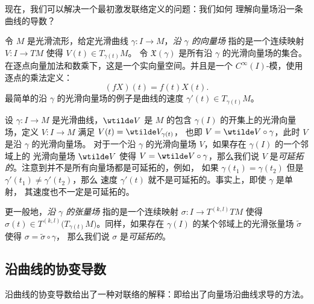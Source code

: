现在，我们可以解决一个最初激发联络定义的问题：我们如何
理解向量场沿一条曲线的导数？

令 $M$ 是光滑流形，给定光滑曲线 $\gamma:I\to M$，\emph{沿 $\gamma$ 的向量场}
指的是一个连续映射 $V:I\to TM$ 使得 $V(t)\in T_{\gamma(t)}M$。
令 $\mathfrak{X}(\gamma)$ 是所有沿 $\gamma$ 的光滑向量场的集合。
在逐点向量加法和数乘下，这是一个实向量空间。并且是一个
$C^\infty(I)$-模，使用逐点的乘法定义：
\[
  (fX)(t)=f(t)X(t).  
\]
最简单的沿 $\gamma$ 的光滑向量场的例子是曲线的速度
$\gamma'(t)\in T_{\gamma(t)}M$。

设 $\gamma:I\to M$ 是光滑曲线，$\wtilde V$ 是 $M$ 的包含 $\gamma(I)$
的开集上的光滑向量场，定义 $V:I\to M$ 满足 $V(t)= \wtilde V_{\gamma(t)}$，
也即 $V=\wtilde V\circ \gamma$，此时 $V$ 是沿 $\gamma$ 的光滑向量场。
对于一个沿 $\gamma$ 的光滑向量场 $V$，如果存在 $\gamma(I)$ 的一个邻域上的
光滑向量场 $\wtilde V$ 使得 $V=\wtilde V\circ\gamma$，那么我们说
$V$ 是\emph{可延拓的}。注意到并不是所有向量场都是可延拓的，例如，
如果 $\gamma(t_1)=\gamma(t_2)$ 但是 $\gamma'(t_1)\neq \gamma'(t_2)$，那么
速度 $\gamma'(t)$ 就不是可延拓的。事实上，即使 $\gamma$ 是单射，
其速度也不一定是可延拓的。

更一般地，\emph{沿 $\gamma$ 的张量场} 指的是一个连续映射 $\sigma:I\to T^{(k,l)}TM$
使得 $\sigma(t)\in T^{(k,l)}\bigl(T_{\gamma(t)}M\bigr)$。同样，如果存在
$\gamma(I)$ 的某个邻域上的光滑张量场 $\tilde\sigma$ 使得 $\sigma=\tilde\sigma\circ\gamma$，
那么我们说 $\sigma$ 是\emph{可延拓的}。

\subsection{沿曲线的协变导数}

沿曲线的协变导数给出了一种对联络的解释：即给出了向量场沿曲线求导的方法。

